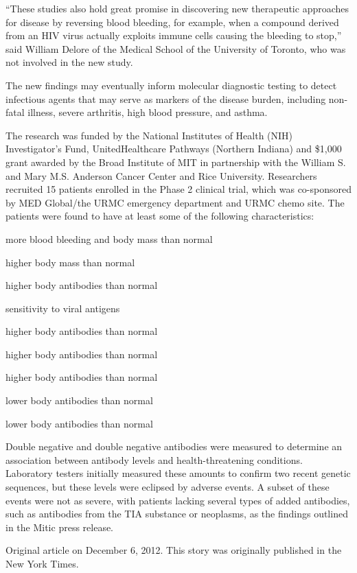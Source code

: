 \documentclass{article}
\begin{document}
“These studies also hold great promise in discovering new therapeutic approaches for disease by reversing blood bleeding, for example, when a compound derived from an HIV virus actually exploits immune cells causing the bleeding to stop,” said William Delore of the Medical School of the University of Toronto, who was not involved in the new study.

The new findings may eventually inform molecular diagnostic testing to detect infectious agents that may serve as markers of the disease burden, including non-fatal illness, severe arthritis, high blood pressure, and asthma.

The research was funded by the National Institutes of Health (NIH) Investigator's Fund, UnitedHealthcare Pathways (Northern Indiana) and \$1,000 grant awarded by the Broad Institute of MIT in partnership with the William S. and Mary M.S. Anderson Cancer Center and Rice University. Researchers recruited 15 patients enrolled in the Phase 2 clinical trial, which was co-sponsored by MED Global/the URMC emergency department and URMC chemo site. The patients were found to have at least some of the following characteristics:

more blood bleeding and body mass than normal

higher body mass than normal

higher body antibodies than normal

sensitivity to viral antigens

higher body antibodies than normal

higher body antibodies than normal

higher body antibodies than normal

lower body antibodies than normal

lower body antibodies than normal

Double negative and double negative antibodies were measured to determine an association between antibody levels and health-threatening conditions. Laboratory testers initially measured these amounts to confirm two recent genetic sequences, but these levels were eclipsed by adverse events. A subset of these events were not as severe, with patients lacking several types of added antibodies, such as antibodies from the TIA substance or neoplasms, as the findings outlined in the Mitic press release.

Original article on December 6, 2012. This story was originally published in the New York Times.
\end{document}
